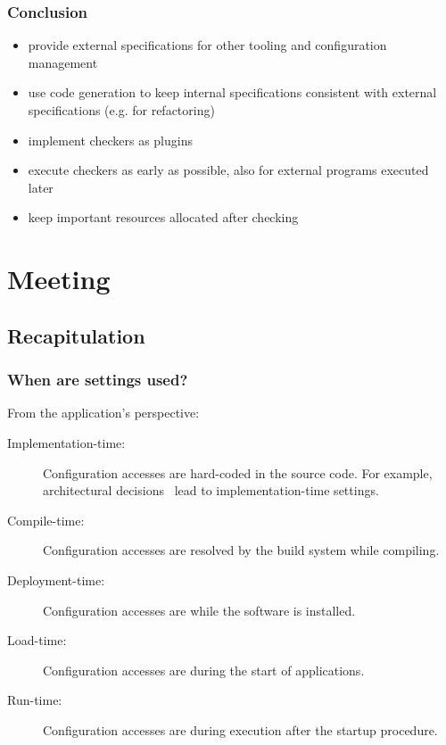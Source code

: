 \begin{frame}
	\frametitle{Conclusion}

	\begin{itemize}[<+-| alert@+>]
	\item provide external specifications for other tooling and configuration management
	\item use code generation to keep internal specifications consistent with external specifications (e.g. for refactoring)
	\item implement checkers as plugins
	\item execute checkers as early as possible,
	also for external programs executed later
	\item keep important resources allocated after checking
	\end{itemize}
\end{frame}

\section{Meeting}

\subsection{Recapitulation}

\begin{frame}
\frametitle{When are settings used?}
	From the application's perspective:
	\vspace{1em}

	\pause

	\begin{description} %
	\item[Implementation-time:] Configuration accesses 
	are hard-coded in the sou\-rce code.
	For example, architectural decisions~\cite{zdun2007patterns} lead to impl\-ementation-time settings.

	\item[Compile-time:] Configuration accesses 
	are resolved by the build system while compiling.

	\item[Deployment-time:] Configuration accesses 
	are while the software is installed.

	\item[Load-time:] Configuration accesses 
	are during the start of applications.

	\item[Run-time:] Configuration accesses 
	are during execution after the startup procedure.
	\end{description}
\end{frame}

